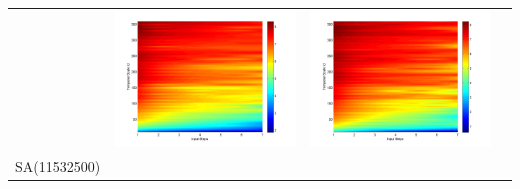 \documentclass[11pt]{article}
\begin{document}
\begin{table}[H]
{\begin{tabular}{cccc}
&\begin{minipage}{.3\textwidth}\includegraphics[width=\linewidth]{resultgraph/AU/05585000pep_abs.png}\end{minipage}
&\begin{minipage}{.3\textwidth}\includegraphics[width=\linewidth]{resultgraph/AU/05585000pepq_abs.png}\end{minipage}
\\
SA(11532500)

\end{tabular}}
\end{table}
\end{document}
